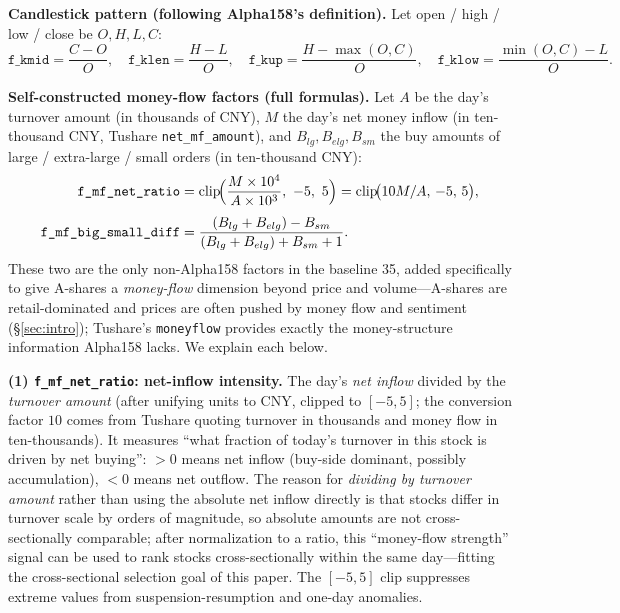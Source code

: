 \documentclass[a4paper,11pt]{article}
\begin{document}
\noindent\textbf{Candlestick pattern (following Alpha158's definition).}
Let open / high / low / close be $O,H,L,C$:
\[
\texttt{f\_kmid}=\frac{C-O}{O},\quad \texttt{f\_klen}=\frac{H-L}{O},\quad
\texttt{f\_kup}=\frac{H-\max(O,C)}{O},\quad \texttt{f\_klow}=\frac{\min(O,C)-L}{O}.
\]

\noindent\textbf{Self-constructed money-flow factors (full formulas).}
Let $A$ be the day's turnover amount (in thousands of CNY), $M$ the day's net
money inflow (in ten-thousand CNY, Tushare \texttt{net\_mf\_amount}), and
$B_{lg},B_{elg},B_{sm}$ the buy amounts of large / extra-large / small orders
(in ten-thousand CNY):
\begin{align*}
\text{\texttt{f\_mf\_net\_ratio}} &= \mathrm{clip}\!\Big(\frac{M\times 10^{4}}{A\times 10^{3}},\ -5,\ 5\Big)
= \mathrm{clip}\!\big(10M/A,\,-5,\,5\big),\\[3pt]
\text{\texttt{f\_mf\_big\_small\_diff}} &= \frac{(B_{lg}+B_{elg})-B_{sm}}{(B_{lg}+B_{elg})+B_{sm}+1}.
\end{align*}
These two are the only non-Alpha158 factors in the baseline 35, added
specifically to give A-shares a \emph{money-flow} dimension beyond price and
volume---A-shares are retail-dominated and prices are often pushed by money
flow and sentiment (\S\ref{sec:intro}); Tushare's \texttt{moneyflow} provides
exactly the money-structure information Alpha158 lacks. We explain each below.

\textbf{(1) \texttt{f\_mf\_net\_ratio}: net-inflow intensity.} The day's
\emph{net inflow} divided by the \emph{turnover amount} (after unifying units to
CNY, clipped to $[-5,5]$; the conversion factor $10$ comes from Tushare quoting
turnover in thousands and money flow in ten-thousands). It measures ``what
fraction of today's turnover in this stock is driven by net buying'': $>0$
means net inflow (buy-side dominant, possibly accumulation), $<0$ means net
outflow. The reason for \emph{dividing by turnover amount} rather than using
the absolute net inflow directly is that stocks differ in turnover scale by
orders of magnitude, so absolute amounts are not cross-sectionally comparable;
after normalization to a ratio, this ``money-flow strength'' signal can be used
to rank stocks cross-sectionally within the same day---fitting the
cross-sectional selection goal of this paper. The $[-5,5]$ clip suppresses
extreme values from suspension-resumption and one-day anomalies.
\end{document}
